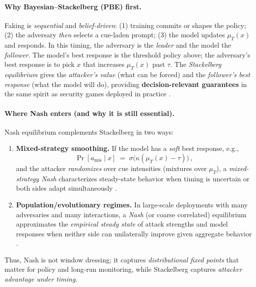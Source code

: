 \paragraph{Why \textbf{Bayesian--Stackelberg} (PBE) first.}
Faking is \emph{sequential} and \emph{belief-driven}: (1) training commits or shapes the policy; (2) the adversary \emph{then} selects a cue-laden prompt; (3) the model updates $\mu_T(x)$ and responds. In this timing, the adversary is the \emph{leader} and the model the \emph{follower}. The model’s best response is the threshold policy above; the adversary’s best response is to pick $x$ that increases $\mu_T(x)$ past $\tau$. The \emph{Stackelberg equilibrium} gives the \emph{attacker’s value} (what can be forced) and the \emph{follower’s best response} (what the model will do), providing \textbf{decision-relevant guarantees} in the same spirit as security games deployed in practice \citep{tambe2011security}.

\paragraph{Where \textbf{Nash} enters (and why it is still essential).}
Nash equilibrium complements Stackelberg in two ways:
\begin{enumerate}[leftmargin=1.5em,itemsep=0.25em]
  \item \textbf{Mixed-strategy smoothing.} If the model has a \emph{soft} best response, e.g.,
  \[
  \Pr[a_{\text{mis}}\mid x]\;=\;\sigma\!\big(\kappa(\mu_T(x)-\tau)\big)\,,
  \]
  and the attacker \emph{randomizes} over cue intensities (mixtures over $\mu_T$), a \emph{mixed-strategy Nash} characterizes steady-state behavior when timing is uncertain or both sides adapt simultaneously \citep{nash1951noncooperative,brown1951iterative}.
  \item \textbf{Population/evolutionary regimes.} In large-scale deployments with many adversaries and many interactions, a \emph{Nash} (or coarse correlated) equilibrium approximates the \emph{empirical steady state} of attack strengths and model responses when neither side can unilaterally improve given aggregate behavior \citep{osborne2004game}.
\end{enumerate}
Thus, Nash is not window dressing; it captures \emph{distributional fixed points} that matter for policy and long-run monitoring, while Stackelberg captures \emph{attacker advantage under timing}.

